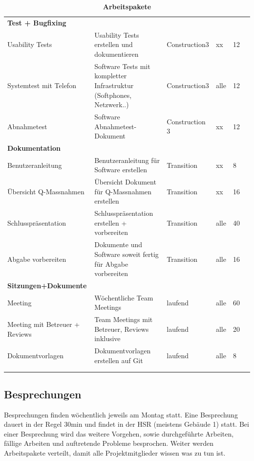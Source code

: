 \documentclass[a4,12pt]{scrartcl}
\begin{document}
\begin{landscape}
\begin{longtable}{ p{5.5cm} p{8cm} l l p{1cm} p{1cm} }
\textbf{Test + Bugfixing}&  &  &  &  & \\ \addlinespace
Usability Tests & Usability Tests erstellen und dokumentieren & Construction3 & xx  & 12  & \\ \addlinespace
Systemtest mit Telefon & Software Tests mit kompletter Infrastruktur (Softphones, Netzwerk..)  & Construction3 &alle  & 12  & \\ \addlinespace
Abnahmetest & Software Abnahmetest-Dokument & Construction 3 & xx & 12 & \\ \addllinespace
\textbf{Dokumentation}&  &  &  &  & \\ \addlinespace
Benutzeranleitung & Benutzeranleitung für Software erstellen  & Transition  & xx  & 8  & \\ \addlinespace
Übersicht Q-Massnahmen & Übersicht Dokument für Q-Massnahmen erstellen  & Transition  & xx  & 16  & \\ \addlinespace
Schlusspräsentation & Schlusspräsentation erstellen + vorbereiten  & Transition  & alle & 40  & \\ \addlinespace
Abgabe vorbereiten& Dokumente und Software soweit fertig für Abgabe vorbereiten & Transition  & alle  & 16  & \\ \addlinespace
\textbf{Sitzungen+Dokumente}&  &  &  &  & \\ \addlinespace
Meeting& Wöchentliche Team Meetings  & laufend & alle  & 60 & \\ \addlinespace
Meeting mit Betreuer + Reviews & Team Meetings mit Betreuer, Reviews inklusive  & laufend  &alle  & 20  & \\ \addlinespace
Dokumentvorlagen & Dokumentvorlagen erstellen auf Git & laufend & alle & 8 & \\ \addlinespace
&  &  &  &  & \\

\hline\caption{\textbf{Arbeitspakete}}
\end{longtable}
\end{landscape}






\subsection{Besprechungen}
Besprechungen finden wöchentlich jeweils am Montag statt. 
Eine Besprechung dauert in der Regel 30min und findet in der HSR (meistens Gebäude 1) statt. Bei einer Besprechung wird das weitere Vorgehen, sowie durchgeführte Arbeiten, fällige Arbeiten und auftretende Probleme besprochen. Weiter werden Arbeitspakete verteilt, damit alle Projektmitglieder wissen was zu tun ist. 
\end{document}
